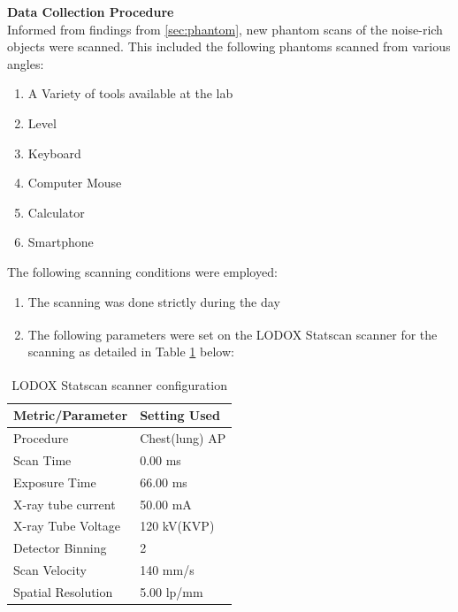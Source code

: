 \textbf{Data Collection Procedure} \\
Informed from findings from \ref{sec:phantom}, new phantom scans of the noise-rich objects were scanned. This included the following phantoms scanned from various angles:

\begin{enumerate}
    \item A Variety of tools available at the lab
    \item Level
    \item Keyboard
    \item Computer Mouse
    \item Calculator
    \item Smartphone
\end{enumerate}

The following scanning conditions were employed:

\begin{enumerate}
    \item The scanning was done strictly during the day
    \item The following parameters were set on the LODOX\textsuperscript{\textregistered} Statscan\textsuperscript{\textregistered} scanner for the scanning as detailed in Table \ref{tab:scansettings} below:
\end{enumerate}

\begin{table}[h!]
    \centering
    \caption{LODOX\textsuperscript{\textregistered} Statscan\textsuperscript{\textregistered} scanner configuration}
    \label{tab:scansettings}
    \begin{tabular}{@{}ll@{}}
    \toprule
    \textbf{Metric/Parameter} & \textbf{Setting Used} \\ \midrule
    Procedure                 & Chest(lung) AP        \\
    Scan Time                 & 0.00 ms               \\
    Exposure Time             & 66.00 ms              \\
    X-ray tube current        & 50.00 mA              \\
    X-ray Tube Voltage        & 120 kV(KVP)           \\
    Detector Binning          & 2                     \\
    Scan Velocity             & 140 mm/s              \\
    Spatial Resolution        & 5.00 lp/mm            \\ \bottomrule
    \end{tabular}
\end{table}


